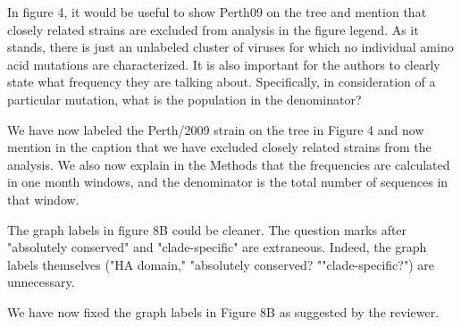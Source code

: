\documentclass[11pt, oneside]{article}   	%
\newcommand{\response}[1]{{\color{black}#1}}
\begin{document}
In figure 4, it would be useful to show Perth09 on the tree and mention that closely related strains are excluded from analysis in the figure legend. As it stands, there is just an unlabeled cluster of viruses for which no individual amino acid mutations are characterized. It is also important for the authors to clearly state what frequency they are talking about. Specifically, in consideration of a particular mutation, what is the population in the denominator? 

\response{We have now labeled the Perth/2009 strain on the tree in Figure 4 and now mention in the caption that we have excluded closely related strains from the analysis.
We also now explain in the Methods that the frequencies are calculated in one month windows, and the denominator is the total number of sequences in that window.
}

The graph labels in figure 8B could be cleaner. The question marks after "absolutely conserved" and "clade-specific" are extraneous. Indeed, the graph labels themselves ("HA domain," "absolutely conserved? ""clade-specific?") are unnecessary. 

\response{We have now fixed the graph labels in Figure 8B as suggested by the reviewer.}
\end{document}
